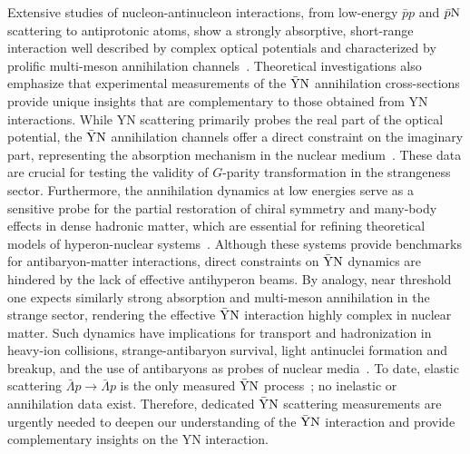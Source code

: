 \documentclass[prd,aps,reprint,noeprint,superscriptaddress,amsmath, amssymb]{revtex4-1}
\begin{document}
Extensive studies of nucleon-antinucleon interactions, from low-energy $\bar{p}p$ and $\bar{p}\rm N$
scattering to antiprotonic atoms, show a strongly absorptive,
short-range interaction well described by complex optical potentials and characterized by prolific multi-meson annihilation channels~\cite{Friedman2007}.
Theoretical investigations also emphasize that experimental measurements of the $\rm \bar{Y}N$ annihilation cross-sections provide unique insights that are complementary to those obtained from YN interactions. While YN scattering primarily probes the real part of the optical potential, the $\rm \bar{Y}N$ annihilation channels offer a direct constraint on the imaginary part, representing the absorption mechanism in the nuclear medium~\cite{Friedman2007}. These data are crucial for testing the validity of $G$-parity transformation in the strangeness sector.
Furthermore, the annihilation dynamics at low energies serve as a sensitive probe for the partial restoration of chiral symmetry and many-body effects in dense hadronic matter, which are essential for refining theoretical models of hyperon-nuclear systems~\cite{Friedman2007}.
Although these systems provide benchmarks for antibaryon-matter interactions,
direct constraints on $\rm \bar{Y}N$ dynamics are hindered by the lack of effective antihyperon beams.
By analogy, near threshold one expects similarly strong absorption and multi-meson annihilation in the strange sector, rendering the effective $\rm \bar{Y}N$ interaction highly complex in nuclear matter. Such dynamics have implications for transport and hadronization in heavy-ion collisions,
strange-antibaryon survival, light antinuclei formation and breakup, and the use of antibaryons as probes of nuclear media~\cite{Tolos2020,Friedman2007}.
To date, elastic scattering $\bar{\Lambda} p\to \bar{\Lambda} p$ is the only measured $\rm \bar{Y}N$ process~\cite{BESIII:2024geh};
no inelastic or annihilation data exist.
Therefore, dedicated $\rm \bar{Y}N$ scattering measurements are urgently needed to deepen our understanding of the $\rm \bar{Y}N$ interaction and provide
complementary insights on the YN interaction.
\end{document}
